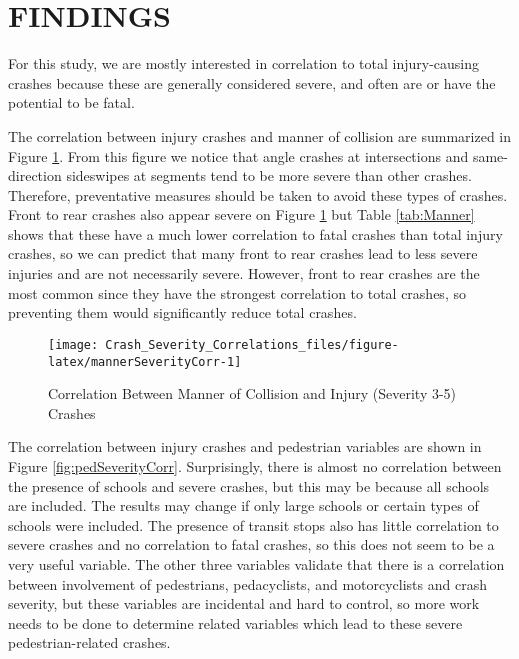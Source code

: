 \documentclass[3p, authoryear]{elsarticle} %
\begin{document}
\hypertarget{findings}{%
\section{FINDINGS}\label{findings}}

For this study, we are mostly interested in correlation to total injury-causing crashes because these are generally considered severe, and often are or have the potential to be fatal.

The correlation between injury crashes and manner of collision are summarized in Figure \ref{fig:mannerSeverityCorr}. From this figure we notice that angle crashes at intersections and same-direction sideswipes at segments tend to be more severe than other crashes. Therefore, preventative measures should be taken to avoid these types of crashes. Front to rear crashes also appear severe on Figure \ref{fig:mannerSeverityCorr} but Table \ref{tab:Manner} shows that these have a much lower correlation to fatal crashes than total injury crashes, so we can predict that many front to rear crashes lead to less severe injuries and are not necessarily severe. However, front to rear crashes are the most common since they have the strongest correlation to total crashes, so preventing them would significantly reduce total crashes.

\begin{figure}

{\centering \texttt{[image: Crash\_Severity\_Correlations\_files/figure-latex/mannerSeverityCorr-1]} 

}

\caption{Correlation Between Manner of Collision and Injury (Severity 3-5) Crashes}\label{fig:mannerSeverityCorr}
\end{figure}

The correlation between injury crashes and pedestrian variables are shown in Figure \ref{fig:pedSeverityCorr}. Surprisingly, there is almost no correlation between the presence of schools and severe crashes, but this may be because all schools are included. The results may change if only large schools or certain types of schools were included. The presence of transit stops also has little correlation to severe crashes and no correlation to fatal crashes, so this does not seem to be a very useful variable. The other three variables validate that there is a correlation between involvement of pedestrians, pedacyclists, and motorcyclists and crash severity, but these variables are incidental and hard to control, so more work needs to be done to determine related variables which lead to these severe pedestrian-related crashes.
\end{document}
